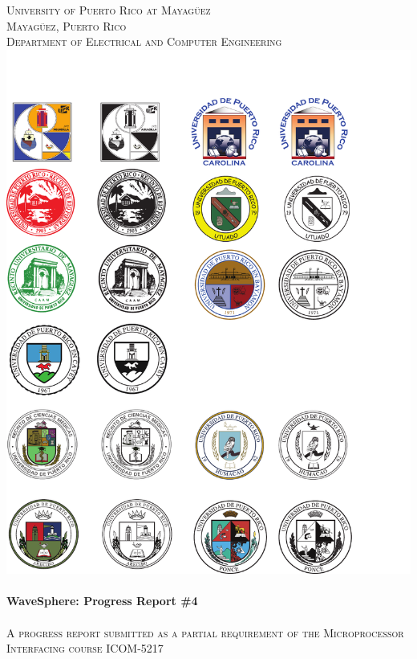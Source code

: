 \begin{titlepage}

\begin{center}


    

\textsc{\large University of Puerto Rico at Mayag\"{u}ez}\\[0.5cm]
\textsc{\large Mayag\"{u}ez, Puerto Rico}\\[0.5cm]
\textsc{\normalsize Department of Electrical and Computer Engineering}\\[1.5cm]
\includegraphics[scale=1.25]{res/logo_rum}\\[1cm]


\HRule \\[0.5cm]
{ \huge \bfseries WaveSphere: Progress Report \#4}\\[0.2cm]
\HRule \\[0.5cm]
\textsc{A progress report submitted as a partial requirement of the Microprocessor Interfacing course ICOM-5217}\\[0.5cm]


\end{center}
\end{titlepage}
